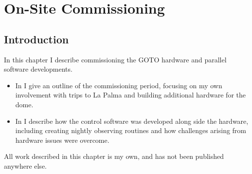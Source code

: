\chapter{On-Site Commissioning}
\label{chap:commissioning}
\chaptoc{}


\newpage
\section{Introduction}
\label{sec:commissioning_intro}
\begin{colsection}

In this chapter I describe commissioning the GOTO hardware and parallel software developments.
%
\begin{itemize}
    \item In  I give an outline of the commissioning period, focusing on my own involvement with trips to La Palma and building additional hardware for the dome.
    \item In  I describe how the control software was developed along side the hardware, including creating nightly observing routines and how challenges arising from hardware issues were overcome.
\end{itemize}
%
All work described in this chapter is my own, and has not been published anywhere else.

\end{colsection}


\newpage
